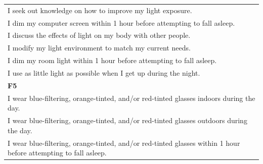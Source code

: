 \documentclass[
  english,
  man]{apa6}
\begin{document}
\begin{appendix}
\begin{longtable}[]{@{}
  >{\raggedright\arraybackslash}p{}@{}}
I seek out knowledge on how to improve my light exposure. \\
I dim my computer screen within 1 hour before attempting to fall
asleep. \\
I discuss the effects of light on my body with other people. \\
I modify my light environment to match my current needs. \\
I dim my room light within 1 hour before attempting to fall asleep. \\
I use as little light as possible when I get up during the night. \\
\textbf{F5} \\
I wear blue-filtering, orange-tinted, and/or red-tinted glasses indoors
during the day. \\
I wear blue-filtering, orange-tinted, and/or red-tinted glasses outdoors
during the day. \\
I wear blue-filtering, orange-tinted, and/or red-tinted glasses within 1
hour before attempting to fall asleep. \\
\bottomrule
\end{longtable}
\end{appendix}

\clearpage
\makeatletter
\efloat@restorefloats
\makeatother
\end{document}
